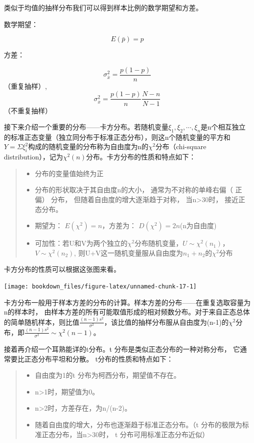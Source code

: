 \documentclass[]{ctexbook}
\providecommand{\tightlist}{%
  \setlength{\itemsep}{0pt}\setlength{\parskip}{0pt}}
\begin{document}
类似于均值的抽样分布我们可以得到样本比例的数学期望和方差。

数学期望：

\[E(\bar p) =p\]

方差：

\[\sigma_{\bar x}^2=\frac{p(1-p)}{n}\] （重复抽样）,
\[\sigma_{\bar x}^2=\frac{p(1-p)}{n}\frac{N-n}{N-1}\]（不重复抽样）

接下来介绍一个重要的分布------卡方分布。若随机变量\(\xi_1,\xi_2,\cdots,\xi_n\)是n个相互独立的标准正态变量（独立同分布于标准正态分布），则这n个随机变量的平方和\(Y=\Sigma\xi_i^2\)构成的随机变量的分布称为自由度为n的\(\chi^2\)分布（chi-square distribution），记为\(\chi^2(n)\)分布。卡方分布的性质和特点如下：

\begin{quote}
\begin{itemize}
\tightlist
\item
  分布的变量值始终为正
\item
  分布的形状取决于其自由度n的大小， 通常为不对称的单峰右偏（ 正偏） 分布， 但随着自由度的增大逐渐趋于对称， 当n\textgreater30时， 接近正态分布。
\item
  期望为： \(E(\chi^2)=n\)，方差为： \(D(\chi^2)=2n\)(n为自由度)
\item
  可加性：若U和V为两个独立的\(\chi^2\)分布随机变量，\(U\sim \chi^2(n_1)\)，\(V\sim \chi^2(n_2)\), 则U+V这一随机变量服从自由度为\(n_1+n_2\)的\(\chi^2\)分布
\end{itemize}
\end{quote}

卡方分布的性质可以根据这张图来看。

\texttt{[image: bookdown\_files/figure-latex/unnamed-chunk-17-1]}

卡方分布一般用于样本方差的分布的计算。样本方差的分布------在重复选取容量为n的样本时， 由样本方差的所有可能取值形成的相对频数分布。对于来自正态总体的简单随机样本，则比值\(\frac{(n-1)s^2}{\sigma^2}\)，该比值的抽样分布服从自由度为(n-1)的\(\chi^2\)分布，即\(\frac{(n-1)s^2}{\sigma^2}\sim \chi^2(n-1)\)。

接着再介绍一个耳熟能详的t分布。t 分布是类似正态分布的一种对称分布， 它通常要比正态分布平坦和分散。 t分布的性质和特点如下：

\begin{quote}
\begin{itemize}
\tightlist
\item
  自由度为1的t 分布为柯西分布，期望值不存在。
\item
  n\textgreater1时，期望值为0。
\item
  n\textgreater2时，方差存在，为n/(n-2)。
\item
  随着自由度的增大，分布也逐渐趋于标准正态分布。（t 分布的极限为标准正态分布，当n\textgreater30时， t 分布可用标准正态分布近似）
\end{itemize}
\end{quote}
\end{document}
